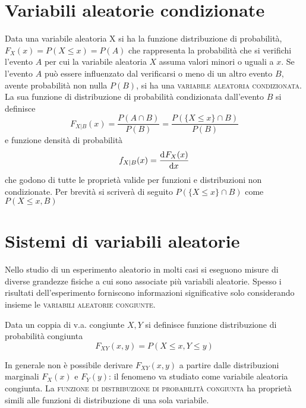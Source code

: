 \section{Variabili aleatorie condizionate}
Data una variabile aleatoria X si ha la funzione distribuzione di probabilità, $F_X(x)=P(X\leq x)=P(A)$ che rappresenta la probabilità che si verifichi l'evento $A$ per cui la variabile aleatoria $X$ assuma valori minori o uguali a $x$.
Se l'evento $A$ può essere influenzato dal verificarsi o meno di un altro evento $B$, avente probabilità non nulla $P(B)$, si ha una \textsc{variabile aleatoria condizionata}.
La sua funzione di distribuzione di probabilità condizionata dall'evento $B$ si definisce
\begin{equation}
	F_{X|B}(x)=\frac{P(A\cap B)}{P(B)}=\frac{P(\lbrace X\leq x\rbrace\cap B)}{P(B)}
\end{equation}
e funzione densità di probabilità
\[
	f_{X|B}(x)=\dfrac{\mathop{}\!\mathrm{d}^{}F_X(x)}{\mathop{}\!\mathrm{d} x^{}}
\]
che godono di tutte le proprietà valide per funzioni e distribuzioni non condizionate.
Per brevità si scriverà di seguito $P(\lbrace X\leq x\rbrace\cap B)$ come $P(X\leq x, B)$

\section{Sistemi di variabili aleatorie}
Nello studio di un esperimento aleatorio in molti casi si eseguono misure di diverse grandezze fisiche a cui sono associate più variabili aleatorie. Spesso i risultati dell'esperimento forniscono informazioni significative solo considerando insieme le \textsc{variabili aleatorie congiunte}.

Data un coppia di v.a. congiunte $X,Y$ si definisce funzione distribuzione di probabilità congiunta
\begin{equation}
\label{eq:funz_dist_prob_congiunta}
	F_{XY}(x,y)=P(X\leq x,Y\leq y)
\end{equation}

In generale non è possibile derivare $F_{XY}(x,y)$ a partire dalle distribuzioni marginali $F_X(x)$ e $F_Y(y)$: il fenomeno va studiato come variabile aleatoria congiunta.
La \textsc{funzione di distribuzione di probabilità congiunta} ha proprietà simili alle funzioni di distribuzione di una sola variabile.\\

